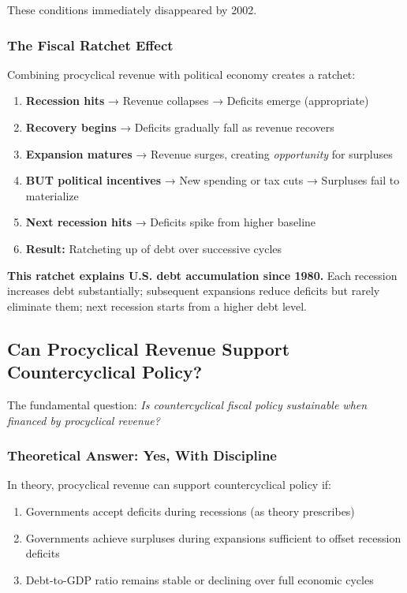 \documentclass[12pt,letterpaper]{article}
\begin{document}
These conditions immediately disappeared by 2002.

\subsubsection{The Fiscal Ratchet Effect}

Combining procyclical revenue with political economy creates a ratchet:

\begin{enumerate}
    \item \textbf{Recession hits} → Revenue collapses → Deficits emerge (appropriate)
    \item \textbf{Recovery begins} → Deficits gradually fall as revenue recovers
    \item \textbf{Expansion matures} → Revenue surges, creating \textit{opportunity} for surpluses
    \item \textbf{BUT political incentives} → New spending or tax cuts → Surpluses fail to materialize
    \item \textbf{Next recession hits} → Deficits spike from higher baseline
    \item \textbf{Result:} Ratcheting up of debt over successive cycles
\end{enumerate}

\textbf{This ratchet explains U.S. debt accumulation since 1980.} Each recession increases debt substantially; subsequent expansions reduce deficits but rarely eliminate them; next recession starts from a higher debt level.

\subsection{Can Procyclical Revenue Support Countercyclical Policy?}

The fundamental question: \textit{Is countercyclical fiscal policy sustainable when financed by procyclical revenue?}

\subsubsection{Theoretical Answer: Yes, With Discipline}

In theory, procyclical revenue can support countercyclical policy if:

\begin{enumerate}
    \item Governments accept deficits during recessions (as theory prescribes)
    \item Governments achieve surpluses during expansions sufficient to offset recession deficits
    \item Debt-to-GDP ratio remains stable or declining over full economic cycles
\end{enumerate}
\end{document}
